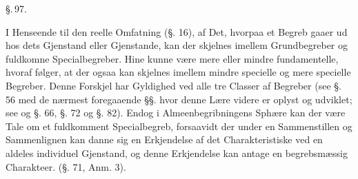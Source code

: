 \documentclass[12pt]{book}
\def\textit#1{#1}%
\def\emph#1{#1}%
\newcommand{\parag}[1]{%
  \par\vspace{0.9\baselineskip}%
  {\centering\textit{\S.\,#1.}\par}%
  \vspace{0.35\baselineskip}%
  \noindent\hspace{\parindent}\ignorespaces
}
\begin{document}
\parag{97}

I Henseende til den \emph{reelle Omfatning} (§. 16), af Det, hvorpaa et Begreb gaaer ud
hos dets Gjenstand eller Gjenstande, kan der skjelnes imellem Grundbegreber og
fuldkomne Specialbegreber. Hine kunne være mere eller mindre fundamentelle, hvoraf
følger, at der ogsaa kan skjelnes imellem mindre specielle og mere specielle Begreber.
Denne Forskjel har Gyldighed ved alle tre Classer af Begreber (see §. 56 med de
nærmest foregaaende §§. hvor denne Lære videre er oplyst og udviklet; see og §. 66,
§. 72 og §. 82).
Endog i Almeenbegribningens Sphære kan der være Tale om et fuldkomment Specialbegreb,
forsaavidt der under en Sammenstillen og Sammenlignen kan danne sig en Erkjendelse af
det Charakteristiske ved en aldeles individuel Gjenstand, og denne Erkjendelse kan
antage en begrebsmæssig Charakteer. (§. 71, Anm. 3).
\end{document}
